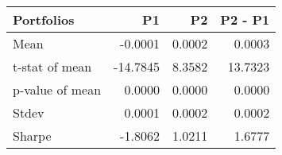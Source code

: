 \begin{tabular}{lrrr}
\toprule
Portfolios & P1 & P2 & P2 - P1 \\
\midrule
Mean & -0.0001 & 0.0002 & 0.0003 \\
t-stat of mean & -14.7845 & 8.3582 & 13.7323 \\
p-value of mean & 0.0000 & 0.0000 & 0.0000 \\
Stdev & 0.0001 & 0.0002 & 0.0002 \\
Sharpe & -1.8062 & 1.0211 & 1.6777 \\
\bottomrule
\end{tabular}
